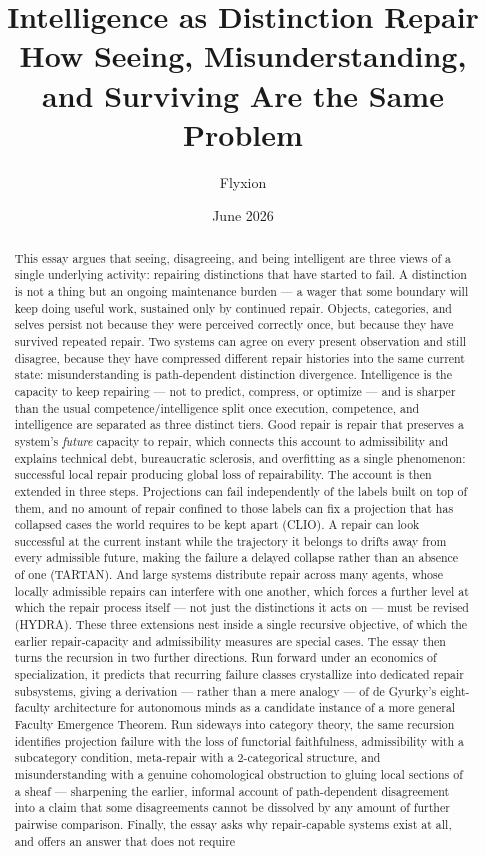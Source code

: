 \documentclass[11pt]{article}
\title{\textbf{Intelligence as Distinction Repair}\\[0.3em]
\large How Seeing, Misunderstanding, and Surviving Are the Same Problem}
\author{Flyxion}
\date{June 2026}
\theoremstyle{plain}
\theoremstyle{definition}
\theoremstyle{remark}
\begin{document}
\maketitle

\begin{abstract}
\noindent
This essay argues that seeing, disagreeing, and being intelligent are three views of a single underlying activity: repairing distinctions that have started to fail. A distinction is not a thing but an ongoing maintenance burden --- a wager that some boundary will keep doing useful work, sustained only by continued repair. Objects, categories, and selves persist not because they were perceived correctly once, but because they have survived repeated repair. Two systems can agree on every present observation and still disagree, because they have compressed different repair histories into the same current state: misunderstanding is path-dependent distinction divergence. Intelligence is the capacity to keep repairing --- not to predict, compress, or optimize --- and is sharper than the usual competence/intelligence split once execution, competence, and intelligence are separated as three distinct tiers. Good repair is repair that preserves a system's \emph{future} capacity to repair, which connects this account to admissibility and explains technical debt, bureaucratic sclerosis, and overfitting as a single phenomenon: successful local repair producing global loss of repairability. The account is then extended in three steps. Projections can fail independently of the labels built on top of them, and no amount of repair confined to those labels can fix a projection that has collapsed cases the world requires to be kept apart (CLIO). A repair can look successful at the current instant while the trajectory it belongs to drifts away from every admissible future, making the failure a delayed collapse rather than an absence of one (TARTAN). And large systems distribute repair across many agents, whose locally admissible repairs can interfere with one another, which forces a further level at which the repair process itself --- not just the distinctions it acts on --- must be revised (HYDRA). These three extensions nest inside a single recursive objective, of which the earlier repair-capacity and admissibility measures are special cases. The essay then turns the recursion in two further directions. Run forward under an economics of specialization, it predicts that recurring failure classes crystallize into dedicated repair subsystems, giving a derivation --- rather than a mere analogy --- of de Gyurky's eight-faculty architecture for autonomous minds as a candidate instance of a more general Faculty Emergence Theorem. Run sideways into category theory, the same recursion identifies projection failure with the loss of functorial faithfulness, admissibility with a subcategory condition, meta-repair with a 2-categorical structure, and misunderstanding with a genuine cohomological obstruction to gluing local sections of a sheaf --- sharpening the earlier, informal account of path-dependent disagreement into a claim that some disagreements cannot be dissolved by any amount of further pairwise comparison. Finally, the essay asks why repair-capable systems exist at all, and offers an answer that does not require 
\end{abstract}
\end{document}
